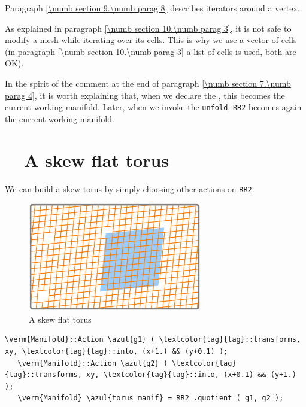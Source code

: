 Paragraph \ref{\numb section 9.\numb parag 8} describes iterators around a vertex.

As explained in paragraph \ref{\numb section 10.\numb parag 3}, it is not safe to
modify a mesh while iterating over its cells.
This is why we use a vector of cells (in paragraph \ref{\numb section 10.\numb parag 3}
a list of cells is used, both are OK).

In the spirit of the comment at the end of paragraph \ref{\numb section 7.\numb parag 4},
it is worth explaining that, when we declare the {\small\tt{}}
{\small\tt{}}, this becomes the current working manifold.
Later, when we invoke the {\small\tt unfold}, {\small\tt RR2} becomes again the current
working manifold.


\section{~~A skew flat torus}\label{\numb section 7.\numb parag 7}

We can build a skew torus by simply choosing other actions on {\small\tt RR2}.

\begin{figure}[ht] \centering
  \includegraphics[width=76mm]{flat-torus-3.eps}
  \caption{A skew flat torus}
  \label{\numb section 7.\numb fig 3}
\end{figure}

\begin{Verbatim}[commandchars=\\\{\},formatcom=\small\tt,frame=single,
   label=parag-\ref{\numb section 7.\numb parag 7}.cpp,rulecolor=\color{coment},
   baselinestretch=0.94,framesep=2mm                                            ]
   \verm{Manifold}::Action \azul{g1} ( \textcolor{tag}{tag}::transforms, xy, \textcolor{tag}{tag}::into, (x+1.) && (y+0.1) );
   \verm{Manifold}::Action \azul{g2} ( \textcolor{tag}{tag}::transforms, xy, \textcolor{tag}{tag}::into, (x+0.1) && (y+1.) );
   \verm{Manifold} \azul{torus_manif} = RR2 .quotient ( g1, g2 );
\end{Verbatim}

